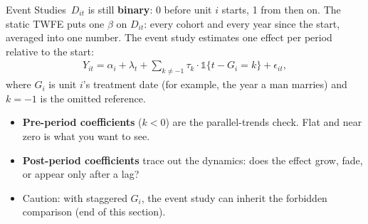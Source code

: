 \documentclass[aspectratio=169,11pt,xcolor=dvipsnames]{beamer}
\newcommand{\core}{\,\raisebox{0.6pt}{\textcolor{corestar}{$\bigstar$}}}
\begin{document}
\begin{frame}{Event Studies\core}
$D_{it}$ is still \textbf{binary}: 0 before unit $i$ starts, 1 from then on. The static TWFE
puts one $\beta$ on $D_{it}$: every cohort and every year since the start, averaged into one
number. The event study estimates one effect per period relative to the start:
\begin{align*}
  Y_{it} = \alpha_i + \lambda_t
  + \sum_{k \neq -1} \tau_k \cdot \mathds{1}\{t - G_i = k\} + \epsilon_{it} ,
\end{align*}
where $G_i$ is unit $i$'s treatment date (for example, the year a man marries) and
$k = -1$ is the omitted reference.
\vskip3pt
\begin{itemize}\itemsep2pt
  \item \textbf{Pre-period coefficients} ($k<0$) are the parallel-trends check.
        Flat and near zero is what you want to see.
  \item \textbf{Post-period coefficients} trace out the dynamics: does the effect
        grow, fade, or appear only after a lag?
  \item \alert{Caution}: with staggered $G_i$, the event study can inherit the forbidden
        comparison (end of this section).
\end{itemize}
\end{frame}
\end{document}
